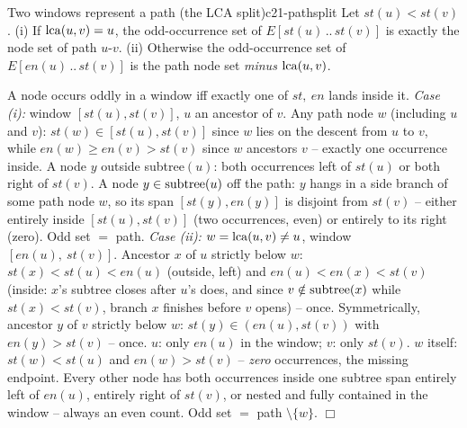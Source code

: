 \begin{theorem}{Two windows represent a path (the LCA split)}{c21-pathsplit}
Let \(st(u)<st(v)\).  (i) If \(\operatorname{lca}(u,v)=u\), the odd-occurrence set of
\(E[st(u)\,..\,st(v)]\) is exactly the node set of path \(u\)-\(v\).
(ii) Otherwise the odd-occurrence set of \(E[en(u)\,..\,st(v)]\) is the path
node set \emph{minus} \(\operatorname{lca}(u,v)\).
\end{theorem}
\begin{proofbox}
A node occurs oddly in a window iff exactly one of \(st,\ en\) lands inside it.
\emph{Case (i):} window \([st(u),st(v)]\), \(u\) an ancestor of \(v\).  Any
path node \(w\) (including \(u\) and \(v\)): \(st(w)\in[st(u),st(v)]\) since
\(w\) lies on the descent from \(u\) to \(v\), while \(en(w)\ge en(v)>st(v)\)
since \(w\) ancestors \(v\) -- exactly one occurrence inside.  A node \(y\)
outside subtree\((u)\): both occurrences left of \(st(u)\) or both right of
\(st(v)\).  A node \(y\in\operatorname{subtree}(u)\) off the path: \(y\) hangs in a side
branch of some path node \(w\), so its span \([st(y),en(y)]\) is disjoint from
\(st(v)\) -- either entirely inside \([st(u),st(v)]\) (two occurrences, even)
or entirely to its right (zero).  Odd set \(=\) path.  \emph{Case (ii):}
\(w=\operatorname{lca}(u,v)\neq u\), window \([en(u),\ st(v)]\).  Ancestor \(x\) of \(u\)
strictly below \(w\): \(st(x)<st(u)<en(u)\) (outside, left) and
\(en(u)<en(x)<st(v)\) (inside: \(x\)'s subtree closes after \(u\)'s does, and
since \(v\notin\operatorname{subtree}(x)\) while \(st(x)<st(v)\), branch \(x\) finishes
before \(v\) opens) -- once.  Symmetrically, ancestor \(y\) of \(v\) strictly
below \(w\): \(st(y)\in(en(u),st(v))\) with \(en(y)>st(v)\) -- once.  \(u\):
only \(en(u)\) in the window; \(v\): only \(st(v)\).  \(w\) itself:
\(st(w)<st(u)\) and \(en(w)>st(v)\) -- \emph{zero} occurrences, the missing
endpoint.  Every other node has both occurrences inside one subtree span
entirely left of \(en(u)\), entirely right of \(st(v)\), or nested and fully
contained in the window -- always an even count.  Odd set
\(=\) path \(\setminus\{w\}\). \(\Box\)
\end{proofbox}


